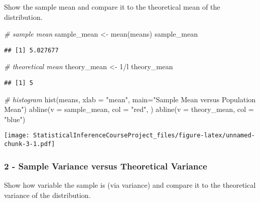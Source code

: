 \documentclass[
]{article}
\newenvironment{Shaded}{\begin{snugshade}}{\end{snugshade}}
\newcommand{\AttributeTok}[1]{\textcolor[rgb]{0.77,0.63,0.00}{#1}}
\newcommand{\CommentTok}[1]{\textcolor[rgb]{0.56,0.35,0.01}{\textit{#1}}}
\newcommand{\DecValTok}[1]{\textcolor[rgb]{0.00,0.00,0.81}{#1}}
\newcommand{\FunctionTok}[1]{\textcolor[rgb]{0.00,0.00,0.00}{#1}}
\newcommand{\NormalTok}[1]{#1}
\newcommand{\OtherTok}[1]{\textcolor[rgb]{0.56,0.35,0.01}{#1}}
\newcommand{\SpecialCharTok}[1]{\textcolor[rgb]{0.00,0.00,0.00}{#1}}
\newcommand{\StringTok}[1]{\textcolor[rgb]{0.31,0.60,0.02}{#1}}
\begin{document}
Show the sample mean and compare it to the theoretical mean of the
distribution.

\begin{Shaded}
\begin{Highlighting}[]
\CommentTok{\# sample mean}
\NormalTok{sample\_mean }\OtherTok{\textless{}{-}} \FunctionTok{mean}\NormalTok{(means)}
\NormalTok{sample\_mean}
\end{Highlighting}
\end{Shaded}

\begin{verbatim}
## [1] 5.027677
\end{verbatim}

\begin{Shaded}
\begin{Highlighting}[]
\CommentTok{\# theoretical mean}
\NormalTok{theory\_mean }\OtherTok{\textless{}{-}} \DecValTok{1}\SpecialCharTok{/}\NormalTok{l}
\NormalTok{theory\_mean}
\end{Highlighting}
\end{Shaded}

\begin{verbatim}
## [1] 5
\end{verbatim}

\begin{Shaded}
\begin{Highlighting}[]
\CommentTok{\# histogram}
\FunctionTok{hist}\NormalTok{(means, }\AttributeTok{xlab =} \StringTok{"mean"}\NormalTok{, }\AttributeTok{main=}\StringTok{"Sample Mean versus Population Mean"}\NormalTok{)}
\FunctionTok{abline}\NormalTok{(}\AttributeTok{v =}\NormalTok{ sample\_mean, }\AttributeTok{col =} \StringTok{"red"}\NormalTok{, )}
\FunctionTok{abline}\NormalTok{(}\AttributeTok{v =}\NormalTok{ theory\_mean, }\AttributeTok{col =} \StringTok{"blue"}\NormalTok{)}
\end{Highlighting}
\end{Shaded}

\texttt{[image: StatisticalInferenceCourseProject\_files/figure-latex/unnamed-chunk-3-1.pdf]}

\hypertarget{sample-variance-versus-theoretical-variance}{%
\subsubsection{2 - Sample Variance versus Theoretical
Variance}\label{sample-variance-versus-theoretical-variance}}

Show how variable the sample is (via variance) and compare it to the
theoretical variance of the distribution.
\end{document}

